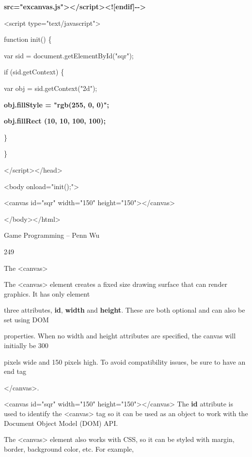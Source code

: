 \documentclass[
]{article}
\begin{document}
\textbf{src="excanvas.js"\textgreater\textless/script\textgreater\textless!{[}endif{]}-\/-\textgreater{}}

\textless script type="text/javascript"\textgreater{}

function init() \{

var sid = document.getElementById("sqr");

if (sid.getContext) \{

var obj = sid.getContext("2d");

\textbf{obj.fillStyle = "rgb(255, 0, 0)";}

\textbf{obj.fillRect (10, 10, 100, 100);}

\}

\}

\textless/script\textgreater\textless/head\textgreater{}

\textless body onload="init();"\textgreater{}

\textless canvas id="sqr" width="150"
height="150"\textgreater\textless/canvas\textgreater{}

\textless/body\textgreater\textless/html\textgreater{}

Game Programming -- Penn Wu

249

\protect\hypertarget{index_split_013.htmlux5cux23p250}{}{}

The \textless canvas\textgreater{}

The \textless canvas\textgreater{} element creates a fixed size drawing
surface that can render graphics. It has only element

three attributes, \textbf{id}, \textbf{width} and \textbf{height}. These
are both optional and can also be set using DOM

properties. When no width and height attributes are specified, the
canvas will initially be 300

pixels wide and 150 pixels high. To avoid compatibility issues, be sure
to have an end tag

\textless/canvas\textgreater.

\textless canvas id="sqr" width="150"
height="150"\textgreater\textless/canvas\textgreater{} The \textbf{id}
attribute is used to identify the \textless canvas\textgreater{} tag so
it can be used as an object to work with the Document Object Model (DOM)
API.

The \textless canvas\textgreater{} element also works with CSS, so it
can be styled with margin, border, background color, etc. For example,
\end{document}
